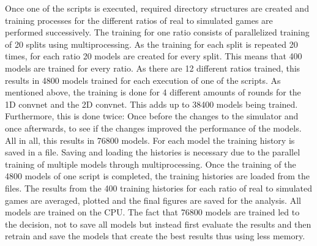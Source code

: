 


Once one of the scripts is executed, required directory structures are created and training processes for the different ratios of real to simulated games are performed successively. The training for one ratio consists of parallelized training of 20 splits using multiprocessing. As the training for each split is repeated 20 times, for each ratio 20 models are created  for every split. This means that 400 models are trained for every ratio. As there are 12 different ratios trained, this results in 4800 models trained for each execution of one of the scripts. As mentioned above, the training is done for 4 different amounts of rounds for the 1D convnet and the 2D convnet. This adds up to 38400 models being trained. Furthermore, this is done twice: Once before the changes to the simulator and once afterwards, to see if the changes improved the performance of the models. All in all, this results in 76800 models. For each model the training history is saved in a file. Saving and loading the histories is necessary due to the parallel training of multiple models through multiprocessing. Once the training of the 4800 models of one script is completed, the training histories are loaded from the files. The results from the 400 training histories for each ratio of real to simulated games are averaged, plotted and the final figures are saved for the analysis.
All models are trained on the CPU. The fact that 76800 models are trained led to the decision, not to save all models but instead first evaluate the results and then retrain and save the models that create the best results thus using less memory.  

